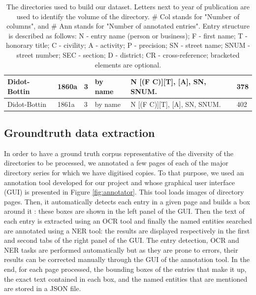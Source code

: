 \begin{table}[h!]
{\begin{tabular}{|l|l|l|l|l|l|}
\\ \hline
Didot-Bottin & 1860a	& 3	& by name & N [(F \textbar C)][T], [A], SN, SNUM. & 378
\\ \hline
Didot-Bottin & 1861a	& 3	& by name & N [(F \textbar C)][T], [A], SN, SNUM. & 402
\\ \hline
\end{tabular}%
}
\caption{The directories used to build our dataset. Letters next to year of publication are used to identify the volume of the directory. \# Col stands for "Number of columns", and \# Ann stands for "Number of annotated entries". Entry structure is described as follows: N - entry name (person or business); F - first name; T - honorary title; C - civility; A - activity; P - precision; SN - street name; SNUM - street number; SEC - section; D - district; CR - cross-reference; bracketed elements are optional.}
\label{tab:directories}
\end{table}

\subsection{Groundtruth data extraction}

In order to have a ground truth corpus representative of the diversity of the directories to be processed, we annotated a few pages of each of the major directory series for which we have digitised copies. To that purpose, we used an annotation tool developed for our project and whose graphical user interface (GUI) is presented in Figure \ref{fig:annotator}. This tool loads images of directory pages. Then, it automatically detects each entry in a given page and builds a box around it : these boxes are shown in the left panel of the GUI. Then the text of each entry is extracted using an OCR tool and finally the named entities searched are annotated using a NER tool: the results are displayed respectively in the first and second tabs of the right panel of the GUI. The entry detection, OCR and NER tasks are performed automatically but as they are prone to errors, their results can be corrected manually through the GUI of the annotation tool. In the end, for each page processed, the bounding boxes of the entries that make it up, the exact text contained in each box, and the named entities that are mentioned are stored in a JSON file.

